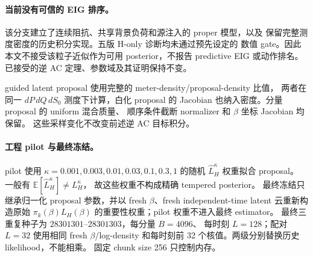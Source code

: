 \paragraph{当前没有可信的 EIG 排序。}

该分支建立了连续阻抗、共享背景负荷和源注入的 proper 模型，以及
保留完整测度密度的历史积分实现。五版 H-only 诊断均未通过预先设定的
数值 gate。因此本文不接受该粒子近似作为可用 posterior，不报告
predictive EIG 或动作排名。已接受的逆 AC 定理、参数域及其证明保持不变。

guided latent proposal 使用完整的 meter-density/proposal-density 比值，
两者在同一 $dP\,dQ\,dS_0$ 测度下计算，白化 proposal 的
Jacobian 也纳入密度。分量 proposal 的 uniform 混合质量、
顺序条件截断 normalizer 和 $\beta$ 坐标 Jacobian 均保留。
这些采样变化不改变前述逆 AC 目标积分。

\paragraph{工程 pilot 与最终冻结。}
pilot 使用 $\kappa=0.001,0.003,0.01,0.03,0.1,0.3,1$
的随机 $\widehat L_H^{\kappa}$ 权重拟合 proposal。
一般有 $\mathbb E[\widehat L_H^{\kappa}]\ne L_H^{\kappa}$，
故这些权重不构成精确 tempered posterior。
最终冻结只继承归一化 proposal 参数，并以 fresh
$\beta$、fresh independent-time latent 云重新构造原始
$\pi_k(\beta)L_H(\beta)$ 的重要性权重；pilot 权重不进入最终 estimator。
最终三重复种子为 $28301301$--$28301303$，每分量 $B=4096$、
每时刻 $L=128$；配对 $L=32$ 使用相同 fresh $\beta$/log-density
和每时刻前 32 个核值。两级分别替换历史 likelihood，不能相乘。
固定 chunk size 256 只控制内存。

